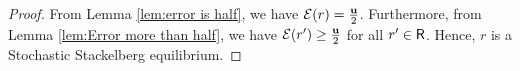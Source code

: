 
















\begin{proof}
    From Lemma \ref{lem:error is half}, we have $\mathcal{E}(r) = \frac{\mathbf{u}}{2}$. Furthermore, from Lemma \ref{lem:Error more than half}, we have $\mathcal{E}(r') \geq \frac{\mathbf{u}}{2}$ for all $r' \in \mathsf{R}$. Hence, $r$ is a Stochastic Stackelberg equilibrium.
\end{proof}


